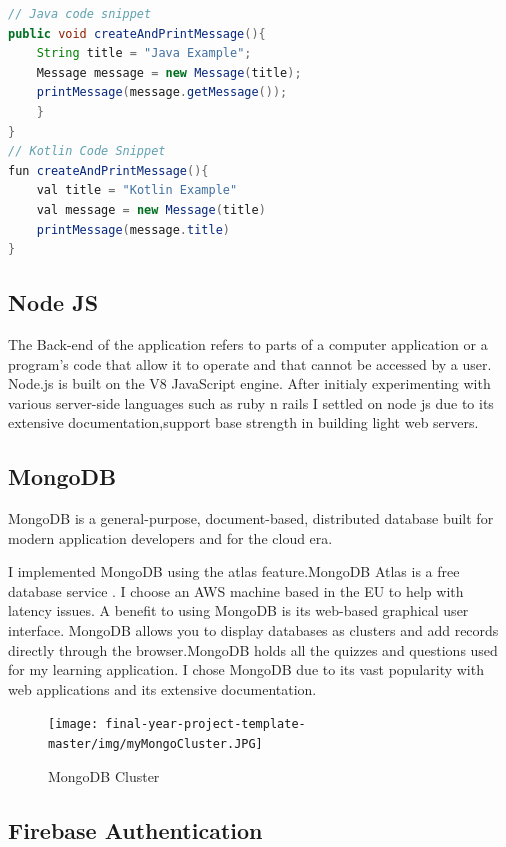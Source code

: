  
 \begin{lstlisting}[language=Java, caption= Java vs Kotlin code Snippet ]
// Java code snippet
public void createAndPrintMessage(){
    String title = "Java Example";
    Message message = new Message(title);
    printMessage(message.getMessage());
    }
}
// Kotlin Code Snippet
fun createAndPrintMessage(){
    val title = "Kotlin Example"
    val message = new Message(title)
    printMessage(message.title)
}
 \end{lstlisting}



\subsection{Node JS} 
The Back-end of the application refers to parts of a computer application or a program's code that allow it to operate and that cannot be accessed by a user.
Node.js is built on the  V8 JavaScript engine. After initialy experimenting with various  server-side languages such as ruby n rails I settled on node js due to its extensive documentation,support base strength in building light web servers.



\subsection{MongoDB}
MongoDB is a general-purpose, document-based, distributed database built for modern application developers and for the cloud era\cite{mongodocs}.   

I implemented MongoDB using the atlas feature.MongoDB Atlas is a  free  database service . I choose an AWS machine based in the EU to help with latency issues. A  benefit to using MongoDB is its web-based graphical user interface. MongoDB allows you to display databases as clusters and add records directly through the browser.MongoDB holds all the quizzes and questions used for my learning application. I chose MongoDB due to its vast popularity with web applications and its extensive documentation.



\begin{figure}[H]
  \centering
    \texttt{[image: final-year-project-template-master/img/myMongoCluster.JPG]}
     \caption{MongoDB Cluster }
\end{figure}




\subsection{Firebase Authentication} 

